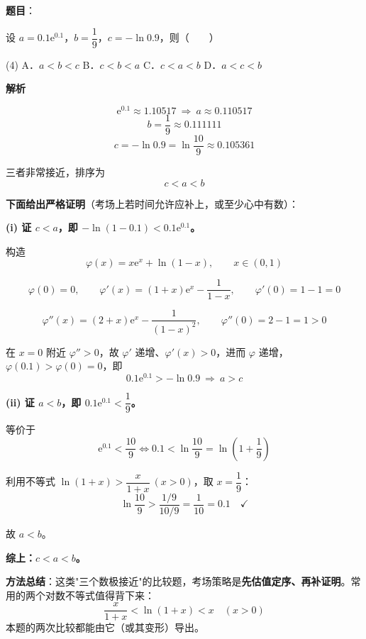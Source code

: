 \begin{answer}

\textbf{题目}：

设 $a=0.1\mathrm e^{0.1}$，$b=\dfrac19$，$c=-\ln0.9$，则\mbox{（　　）}

\begin{gkopts}(4)
\task A．$a<b<c$
\task B．$c<b<a$
\task C．$c<a<b$
\task D．$a<c<b$
\end{gkopts}

\textbf{解析}

\nopagebreak[4]
\[\mathrm e^{0.1}\approx1.10517\ \Longrightarrow\ a\approx0.110517\]
\nopagebreak[4]
\[b=\frac19\approx0.111111\]
\nopagebreak[4]
\[c=-\ln0.9=\ln\frac{10}9\approx0.105361\]

三者非常接近，排序为
\nopagebreak[4]
\[c<a<b\]

\textbf{下面给出严格证明}（考场上若时间允许应补上，或至少心中有数）：

\textbf{(i) 证 $c<a$，即 $-\ln(1-0.1)<0.1\mathrm e^{0.1}$。}

构造
\nopagebreak[4]
\[\varphi(x)=x\mathrm e^{x}+\ln(1-x),\qquad x\in(0,1)\]

\nopagebreak[4]
\[\varphi(0)=0,\qquad \varphi'(x)=(1+x)\mathrm e^{x}-\frac1{1-x},\qquad \varphi'(0)=1-1=0\]

\nopagebreak[4]
\[\varphi''(x)=(2+x)\mathrm e^{x}-\frac1{(1-x)^{2}},\qquad \varphi''(0)=2-1=1>0\]

在 $x=0$ 附近 $\varphi''>0$，故 $\varphi'$ 递增、$\varphi'(x)>0$，进而 $\varphi$ 递增，$\varphi(0.1)>\varphi(0)=0$，即
\nopagebreak[4]
\[0.1\mathrm e^{0.1}>-\ln0.9\ \Longrightarrow\ a>c\]

\textbf{(ii) 证 $a<b$，即 $0.1\mathrm e^{0.1}<\dfrac19$。}

等价于
\nopagebreak[4]
\[\mathrm e^{0.1}<\frac{10}9\iff 0.1<\ln\frac{10}9=\ln\left(1+\frac19\right)\]

利用不等式 $\ln(1+x)>\dfrac x{1+x}\ (x>0)$，取 $x=\dfrac19$：
\nopagebreak[4]
\[\ln\frac{10}9>\frac{1/9}{10/9}=\frac1{10}=0.1\quad\checkmark\]

故 $a<b$。

\textbf{综上：$c<a<b$。}

\begin{gktip}
\textbf{方法总结}：这类"三个数极接近"的比较题，考场策略是\textbf{先估值定序、再补证明}。常用的两个对数不等式值得背下来：
\nopagebreak[4]
\[\frac{x}{1+x}<\ln(1+x)<x\quad(x>0)\]
本题的两次比较都能由它（或其变形）导出。
\end{gktip}


\par\medskip

\end{answer}
